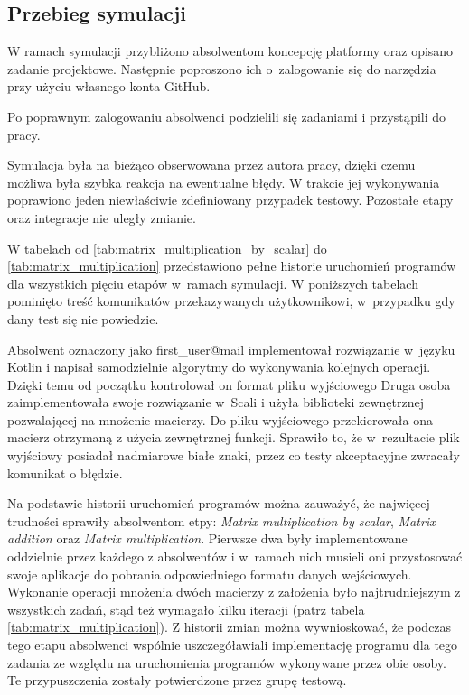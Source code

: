 \subsection{Przebieg symulacji}
\label{matrix_simulation}

W ramach symulacji przybliżono absolwentom koncepcję platformy oraz opisano zadanie projektowe.
Następnie poproszono ich o~zalogowanie się do narzędzia przy użyciu własnego konta GitHub.

Po poprawnym zalogowaniu absolwenci podzielili się zadaniami i przystąpili do pracy.

Symulacja była na bieżąco obserwowana przez autora pracy, dzięki czemu możliwa była szybka reakcja na ewentualne błędy.
W trakcie jej wykonywania poprawiono jeden niewłaściwie zdefiniowany przypadek testowy.
Pozostałe etapy oraz integracje nie uległy zmianie.

W tabelach od \ref{tab:matrix_multiplication_by_scalar} do \ref{tab:matrix_multiplication} przedstawiono pełne historie uruchomień programów dla wszystkich pięciu etapów w~ramach symulacji.
W poniższych tabelach pominięto treść komunikatów przekazywanych użytkownikowi, w~przypadku gdy dany test się nie powiedzie.




\pagebreak









Absolwent oznaczony jako first\_user@mail implementował rozwiązanie w~języku Kotlin i napisał samodzielnie algorytmy do wykonywania kolejnych operacji.
Dzięki temu od początku kontrolował on format pliku wyjściowego
Druga osoba zaimplementowała swoje rozwiązanie w~Scali i użyła biblioteki zewnętrznej pozwalającej na mnożenie macierzy.
Do pliku wyjściowego przekierowała ona macierz otrzymaną z użycia zewnętrznej funkcji.
Sprawiło to, że w~rezultacie plik wyjściowy posiadał nadmiarowe białe znaki, przez co testy akceptacyjne zwracały komunikat o błędzie.


Na podstawie historii uruchomień programów można zauważyć, że najwięcej trudności sprawiły absolwentom etpy: \textit{Matrix multiplication by scalar}, \textit{Matrix addition} oraz \textit{Matrix multiplication}.
Pierwsze dwa były implementowane oddzielnie przez każdego z absolwentów i w~ramach nich musieli oni przystosować swoje aplikacje do pobrania odpowiedniego formatu danych wejściowych.
Wykonanie operacji mnożenia dwóch macierzy z założenia było najtrudniejszym z wszystkich zadań, stąd też wymagało kilku iteracji (patrz tabela \ref{tab:matrix_multiplication}).
Z historii zmian można wywnioskować, że podczas tego etapu absolwenci wspólnie uszczegóławiali implementację programu dla tego zadania ze względu na uruchomienia programów wykonywane przez obie osoby.
Te przypuszczenia zostały potwierdzone przez grupę testową.

